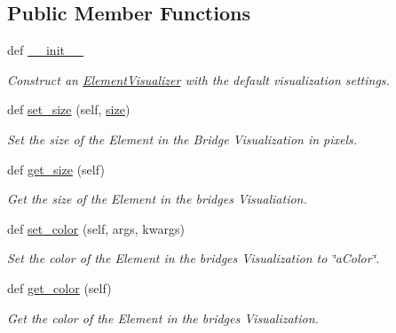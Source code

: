 \subsection*{Public Member Functions}
\begin{DoxyCompactItemize}
\item 
def \hyperlink{class_bridges_1_1element__visualizer_1_1_element_visualizer_a01f3c2221b2067f323c150c859cb519b}{\+\_\+\+\_\+init\+\_\+\+\_\+}
\begin{DoxyCompactList}\small\item\em Construct an \hyperlink{class_bridges_1_1element__visualizer_1_1_element_visualizer}{Element\+Visualizer} with the default visualization settings. \end{DoxyCompactList}\item 
def \hyperlink{class_bridges_1_1element__visualizer_1_1_element_visualizer_ad3d6b884bca4cd65a300d7ca5a9a6ebb}{set\+\_\+size} (self, \hyperlink{class_bridges_1_1element__visualizer_1_1_element_visualizer_a310edf0712e14c6d01264ca050166872}{size})
\begin{DoxyCompactList}\small\item\em Set the size of the Element in the Bridge Visualization in pixels. \end{DoxyCompactList}\item 
def \hyperlink{class_bridges_1_1element__visualizer_1_1_element_visualizer_a43e24d7977692b676da745c9a775c2d7}{get\+\_\+size} (self)
\begin{DoxyCompactList}\small\item\em Get the size of the Element in the bridges Visualiation. \end{DoxyCompactList}\item 
def \hyperlink{class_bridges_1_1element__visualizer_1_1_element_visualizer_a5dceeba34842559488e0fca0013d97eb}{set\+\_\+color} (self, args, kwargs)
\begin{DoxyCompactList}\small\item\em Set the color of the Element in the bridges Visualization to \char`\"{}a\+Color\char`\"{}. \end{DoxyCompactList}\item 
def \hyperlink{class_bridges_1_1element__visualizer_1_1_element_visualizer_a9609a09051cba296c42be588786be4da}{get\+\_\+color} (self)
\begin{DoxyCompactList}\small\item\em Get the color of the Element in the bridges Visualization. \end{DoxyCompactList}\item 

\end{DoxyCompactItemize}
